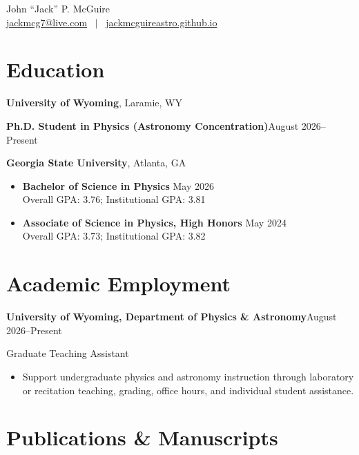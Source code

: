\documentclass[10pt,a4paper]{article}
\newcommand{\entry}[2]{%
  \par\vspace{2pt}%
  \noindent\textbf{#1}\hfill#2\par
}
\newcommand{\cvline}[1]{\noindent#1\par}
\newenvironment{items}
  {\begin{itemize}[leftmargin=1.2em,itemsep=0.6pt,topsep=1.5pt,parsep=0pt,
                   label=\textbullet]}
  {\end{itemize}}
\begin{document}
\begin{center}
  {\LARGE John ``Jack'' P. McGuire}\\[3pt]
  {\small\href{mailto:jackmcg7@live.com}{jackmcg7@live.com}
   \ $\vert$ \
   \href{https://jackmcguireastro.github.io}{jackmcguireastro.github.io}}
\end{center}
\vspace{4pt}

\section{Education}

\cvline{\textbf{University of Wyoming}, Laramie, WY}
\entry{Ph.D. Student in Physics (Astronomy Concentration)}{August 2026--Present}

\vspace{3pt}
\cvline{\textbf{Georgia State University}, Atlanta, GA}
\begin{items}
  \item \textbf{Bachelor of Science in Physics} \hfill May 2026 \\
        Overall GPA: 3.76; Institutional GPA: 3.81
  \item \textbf{Associate of Science in Physics, High Honors} \hfill May 2024 \\
        Overall GPA: 3.73; Institutional GPA: 3.82
\end{items}

\section{Academic Employment}

\entry{University of Wyoming, Department of Physics \& Astronomy}{August 2026--Present}
\cvline{Graduate Teaching Assistant}
\begin{items}
  \item Support undergraduate physics and astronomy instruction through laboratory or
        recitation teaching, grading, office hours, and individual student assistance.
\end{items}

\section{Publications \& Manuscripts}
\end{document}

